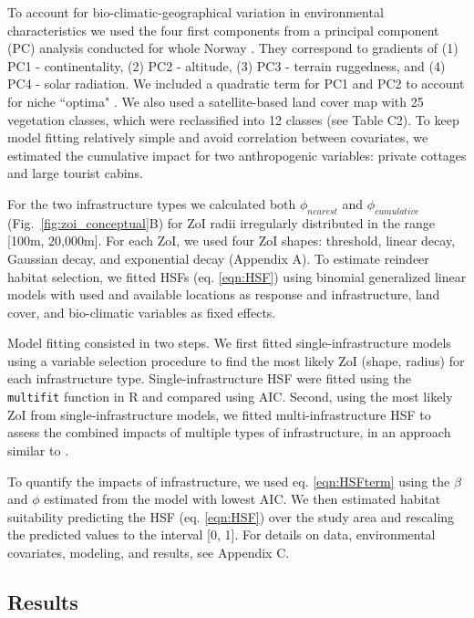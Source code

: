 \documentclass[titlepage]{article}
\begin{document}
To account for bio-climatic-geographical variation in environmental characteristics we used the four first components from a principal component (PC) analysis conducted for whole Norway \citep{bakkestuen_step-less_2008}. They correspond to gradients of (1) PC1 - continentality, (2) PC2 - altitude, (3) PC3 - terrain ruggedness, and (4) PC4 - solar radiation. We included a quadratic term for PC1 and PC2 to account for niche ``optima" \citep[\textit{sensu}][]{panzacchi_searching_2015}. We also used a satellite-based land cover map with 25 vegetation classes, which were reclassified into 12 classes (see Table C2). To keep model fitting relatively simple and avoid correlation between covariates, we estimated the cumulative impact for two anthropogenic variables: private cottages and large tourist cabins.

For the two infrastructure types we calculated both $\phi_{nearest}$ and $\phi_{cumulative}$ (Fig.~\ref{fig:zoi_conceptual}B) for ZoI radii irregularly distributed in the range [100m, 20,000m]. For each ZoI, we used four ZoI shapes: threshold, linear decay, Gaussian decay, and exponential decay (Appendix A). To estimate reindeer habitat selection, we fitted HSFs (eq. \ref{eqn:HSF}) using binomial generalized linear models \citep{fieberg_how_2021} with used and available locations as response and infrastructure, land cover, and bio-climatic variables as fixed effects. 

Model fitting consisted in two steps. We first fitted single-infrastructure models using a variable selection procedure \citep{burnham_model_2002} to find the most likely ZoI (shape, radius) for each infrastructure type. Single-infrastructure HSF were fitted using the \verb|multifit| function in R \citep{huais_multifit_2018} and compared using AIC. Second, using the most likely ZoI from single-infrastructure models, we fitted multi-infrastructure HSF to assess the combined impacts of multiple types of infrastructure, in an approach similar to \citet{laforge_process-focussed_2015}. 

To quantify the impacts of infrastructure, we used eq. \ref{eqn:HSFterm} using the $\beta$ and $\phi$ estimated from the model with lowest AIC. We then estimated habitat suitability predicting the HSF (eq. \ref{eqn:HSF}) over the study area and rescaling the predicted values to the interval [0, 1]. For details on data, environmental covariates, modeling, and results, see Appendix C.

\subsection{Results}
\end{document}
